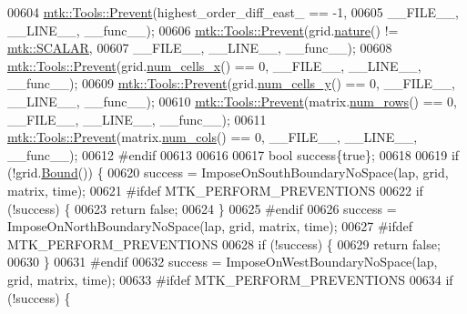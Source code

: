 \begin{DoxyCode}
00604   \hyperlink{classmtk_1_1Tools_a332324c6f25e66be9dff48c5987a3b9f}{mtk::Tools::Prevent}(highest\_order\_diff\_east\_ == -1,
00605                       \_\_FILE\_\_, \_\_LINE\_\_, \_\_func\_\_);
00606   \hyperlink{classmtk_1_1Tools_a332324c6f25e66be9dff48c5987a3b9f}{mtk::Tools::Prevent}(grid.\hyperlink{classmtk_1_1UniStgGrid2D_a99a3a9cdb05b7306be99bde935509e30}{nature}() != \hyperlink{namespacemtk_ga4c54f2a329cfb4e56213b02a259d19e2af481d45bd70d41381c7d72e200889205}{mtk::SCALAR},
00607                       \_\_FILE\_\_, \_\_LINE\_\_, \_\_func\_\_);
00608   \hyperlink{classmtk_1_1Tools_a332324c6f25e66be9dff48c5987a3b9f}{mtk::Tools::Prevent}(grid.\hyperlink{classmtk_1_1UniStgGrid2D_a2d182866a398aba8e4829590e85bf939}{num\_cells\_x}() == 0, \_\_FILE\_\_, \_\_LINE\_\_, \_\_func\_\_);
00609   \hyperlink{classmtk_1_1Tools_a332324c6f25e66be9dff48c5987a3b9f}{mtk::Tools::Prevent}(grid.\hyperlink{classmtk_1_1UniStgGrid2D_aed05a801cc9a76dba0ff203cea58a61a}{num\_cells\_y}() == 0, \_\_FILE\_\_, \_\_LINE\_\_, \_\_func\_\_);
00610   \hyperlink{classmtk_1_1Tools_a332324c6f25e66be9dff48c5987a3b9f}{mtk::Tools::Prevent}(matrix.\hyperlink{classmtk_1_1DenseMatrix_a53f3afb3b6a8d21854458aaa9663cc74}{num\_rows}() == 0, \_\_FILE\_\_, \_\_LINE\_\_, \_\_func\_\_);
00611   \hyperlink{classmtk_1_1Tools_a332324c6f25e66be9dff48c5987a3b9f}{mtk::Tools::Prevent}(matrix.\hyperlink{classmtk_1_1DenseMatrix_a41747502d468c6728a4be31501b16e0e}{num\_cols}() == 0, \_\_FILE\_\_, \_\_LINE\_\_, \_\_func\_\_);
00612 \textcolor{preprocessor}{  #endif}
00613 
00616 
00617   \textcolor{keywordtype}{bool} success\{\textcolor{keyword}{true}\};
00618 
00619   \textcolor{keywordflow}{if} (!grid.\hyperlink{classmtk_1_1UniStgGrid2D_aa651194ccd0321a7c61a8f56fa5e8455}{Bound}()) \{
00620     success = ImposeOnSouthBoundaryNoSpace(lap, grid, matrix, time);
00621 \textcolor{preprocessor}{    #ifdef MTK\_PERFORM\_PREVENTIONS}
00622     \textcolor{keywordflow}{if} (!success) \{
00623       \textcolor{keywordflow}{return} \textcolor{keyword}{false};
00624     \}
00625 \textcolor{preprocessor}{    #endif}
00626     success = ImposeOnNorthBoundaryNoSpace(lap, grid, matrix, time);
00627 \textcolor{preprocessor}{    #ifdef MTK\_PERFORM\_PREVENTIONS}
00628     \textcolor{keywordflow}{if} (!success) \{
00629       \textcolor{keywordflow}{return} \textcolor{keyword}{false};
00630     \}
00631 \textcolor{preprocessor}{    #endif}
00632     success = ImposeOnWestBoundaryNoSpace(lap, grid, matrix, time);
00633 \textcolor{preprocessor}{    #ifdef MTK\_PERFORM\_PREVENTIONS}
00634     \textcolor{keywordflow}{if} (!success) \{

\end{DoxyCode}
